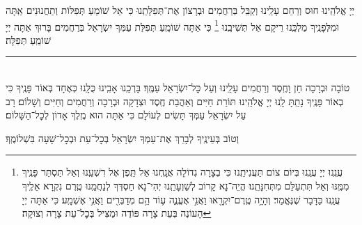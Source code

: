 {\weekdaysageulah

\weekdaysaanneinu

\weekdaysarefuah

\weekdaysaberacha

\weekdaysashofar

\weekdaysamishpat

\weekdaysaminim

\weekdaysatzadikim

\yerushwithnachem

\weekdaysamalchus

יְיָ אֱלֹהֵֽינוּ חוּס וְרַחֵם עָלֵֽינוּ וְקַבֵּל בְּרַחֲמִים וּבְרָצוֹן אֶת־תְּפִלָּתֵֽנוּ כִּי אֵל שׁוֹמֵעַ תְּפִלּוֹת וְתַחֲנוּנִים אַֽתָּה וּמִלְּפָנֶֽיךָ מַלְכֵּֽנוּ רֵיקָם אַל תְּשִׁיבֵֽנוּ
\footnote{
עֲנֵֽנוּ יְיָ עֲנֵֽנוּ בְּיוֹם צוֹם תַּעֲנִיתֵֽנוּ כִּי בְצָרָה גְדוֹלָה אֲנָֽחְנוּ אַל תֵּֽפֶן אֶל רִשְׁעֵֽנוּ וְאַל תַּסְתֵּר פָּנֶֽיךָ מִמֶּֽנּוּ וְאַל תִּתְעַלַּם מִתְּחִנָּתֵֽנוּ׃ הֱיֵה־נָא קָרוֹב לְשַׁוְעָתֵֽנוּ יְהִי־נָא חַסְדְּךָ לְנַחֲמֵֽנוּ טֶֽרֶם נִקְרָא אֵלֶֽיךָ עֲנֵֽנוּ כַּדָּבָר שֶׁנֶּאֱמַר׃
%
וְהָיָ֥ה טֶֽרֶם־יִקְרָ֖אוּ וַאֲנִ֣י אֶעֱנֶ֑ה ע֛וֹד הֵ֥ם מְדַבְּרִ֖ים וַאֲנִ֥י אֶשְׁמָֽע׃ כִּי אַתָּה יְיָ הָעוֹנֶה בְּעֵת צָרָה פּוֹדֶה וּמַצִּיל בְּכׇל־עֵת צָרָה וְצוּקָה׃
}
כִּי אַתָּה שׁוֹמֵֽעַ תְּפִלַּת עַמְּךָ יִשְׂרָאֵל בְּרַחֲמִים׃ בָּרוּךְ אַתָּה יְיָ שׁוֹמֵֽעַ תְּפִלָּה׃

\retzeh

\yaalehveyavo

\zion

\modim

\alhanisim

\weekdaysahodos


\rule[-0.5ex]{3in}{1pt}

\begin{paracol}{2}
\\
טוֹבָה וּבְרָכָה חֵן וָחֶֽסֶד וְרַחֲמִים עָלֵֽינוּ וְעַל כׇּל־יִשְׂרָאֵל עַמֶּֽךָ׃ בָּרְכֵֽנוּ אָבִֽינוּ כֻּלָּֽנוּ כְּאֶחָד בְּאוֹר פָּנֶֽיךָ כִּי בְאוֹר פָּנֶֽיךָ נָתַֽתָּ לָֽנוּ יְיָ אֱלֹהֵֽינוּ תּוֹרַת חַיִּים וְאַהֲבַת חֶֽסֶד וּצְדָקָה וּבְרָכָה וְרַחֲמִים וְחַיִּים וְשָׁלוֹם׃
\switchcolumn
{}
רָב עַל יִשְׂרָאֵל עַמְּךָ תָּשִׂים לְעוֹלָם כִּי אַתָּה הוּא מֶֽלֶךְ אָדוֹן לְכׇל־הַשָּׁלוֹם׃
\end{paracol}
וְטוֹב בְּעֵינֶֽיךָ לְבָרֵךְ אֶת־עַמְּךָ יִשְׂרָאֵל בְּכׇל־עֵת וּבְכׇל־שָׁעָה בִּשְׁלוֹמֶֽךָ׃


}
